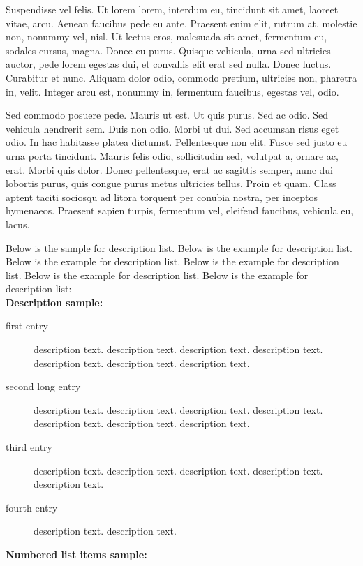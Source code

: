 \documentclass[AMS,STIX2COL]{WileyNJD-v2}
\begin{document}
    Suspendisse vel felis. Ut lorem lorem, interdum eu, tincidunt sit amet, laoreet vitae, arcu. Aenean faucibus pede eu
    ante. Praesent enim elit, rutrum at, molestie non, nonummy vel, nisl. Ut lectus eros, malesuada sit amet, fermentum
    eu, sodales cursus, magna. Donec eu purus. Quisque vehicula, urna sed ultricies auctor, pede lorem egestas dui, et
    convallis elit erat sed nulla. Donec luctus. Curabitur et nunc. Aliquam dolor odio, commodo pretium, ultricies non,
    pharetra in, velit. Integer arcu est, nonummy in, fermentum faucibus, egestas vel, odio.

    Sed commodo posuere pede. Mauris ut est. Ut quis purus. Sed ac odio. Sed vehicula hendrerit sem. Duis non
    odio. Morbi ut dui. Sed accumsan risus eget odio. In hac habitasse platea dictumst. Pellentesque non elit. Fusce
    sed justo eu urna porta tincidunt. Mauris felis odio, sollicitudin sed, volutpat a, ornare ac, erat. Morbi quis dolor. Donec pellentesque, erat ac sagittis semper, nunc dui lobortis purus, quis congue purus metus ultricies tellus. Proin
    et quam. Class aptent taciti sociosqu ad litora torquent per conubia nostra, per inceptos hymenaeos. Praesent sapien
    turpis, fermentum vel, eleifend faucibus, vehicula eu, lacus.


    Below is the sample for description list. Below is the example for description list. Below is the example for description list. Below is the example for description list. Below is the example for description list. Below is the example for description list:\\[12pt]


    \noindent\textbf{Description sample:}

    \begin{description}
        \item[first entry] description text. description text. description text. description text. description text. description text. description text.
        \item[second long entry] description text. description text. description text. description text. description text. description text. description text.
        \item[third entry] description text. description text. description text. description text. description text.
        \item[fourth entry] description text. description text.
    \end{description}


    \noindent\textbf{Numbered list items sample:}
\end{document}
